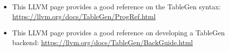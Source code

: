 
\begin{itemize}
\item This LLVM page provides a good reference on the TableGen syntax: \url{https://llvm.org/docs/TableGen/ProgRef.html}

\item This LLVM page provides a good reference on developing a TableGen backend: \url{https://llvm.org/docs/TableGen/BackGuide.html}
\end{itemize}